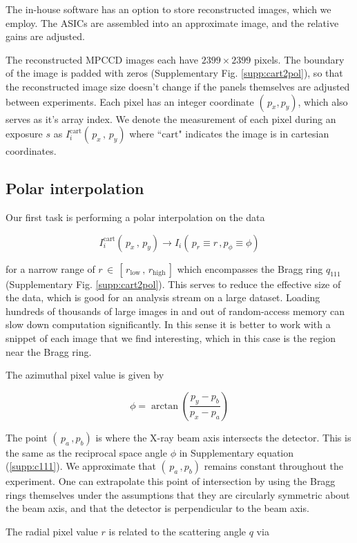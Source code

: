 \documentclass [12pt,fleqn]{article}
\def \be {\begin{equation}}
\def \ee {\end{equation}}
\begin{document}
The in-house software has an option to store reconstructed images, which we employ. The ASICs are assembled into an approximate image, and the relative gains are adjusted. 

The reconstructed MPCCD images each have $2399\times 2399$ pixels. The boundary of the image is padded with zeros (Supplementary Fig. \ref{supp:cart2pol}), so that the reconstructed image size doesn't change if the panels themselves are adjusted between experiments. Each pixel has an integer coordinate $(\,p_x, p_y)$, which also serves as it's array index. We denote the measurement of each pixel during an exposure $s$ as $I_i^{ \mathrm{cart} }(\,p_x\,, \,p_y)$ where ``$\text{cart}$" indicates the image is in cartesian coordinates.


\subsection{Polar interpolation}
Our first task is performing a polar interpolation on the data

\be
I_i^{ \mathrm{cart} }(\,p_x\,, \, p_y) \rightarrow I_i(\,p_r\equiv r \,, p_\phi \equiv \phi)
\ee

for a narrow range of $r \,\in\, [\,r_{\text{low}}\,,\, r_{\text{high}}\,]$ which encompasses the Bragg ring $q_{111}$ (Supplementary Fig. \ref{supp:cart2pol}). This serves to reduce the effective size of the data, which is good for an analysis stream on a large dataset. Loading hundreds of thousands of large images in and out of random-access memory can slow down computation significantly. In this sense it is better to work with a snippet of each image that we find interesting, which in this case is the region near the Bragg ring.

The azimuthal pixel value is given by

\be
\phi = \arctan\left( \frac{p_y - p_b}{p_x - p_a} \right )
\ee

The point $(\,p_a\,,p_b)$ is where the X-ray beam axis intersects the detector. This is the same  as the reciprocal space angle $\phi$ in Supplementary equation (\ref{supp:c111}). We approximate that $(\,p_a\,,p_b)$ remains constant throughout the experiment. One can extrapolate this point of intersection by using the Bragg rings themselves under the assumptions that they are circularly symmetric about the beam axis, and that the detector is perpendicular to the beam axis.

The radial pixel value $r$ is related to the scattering angle $q$ via
\end{document}

